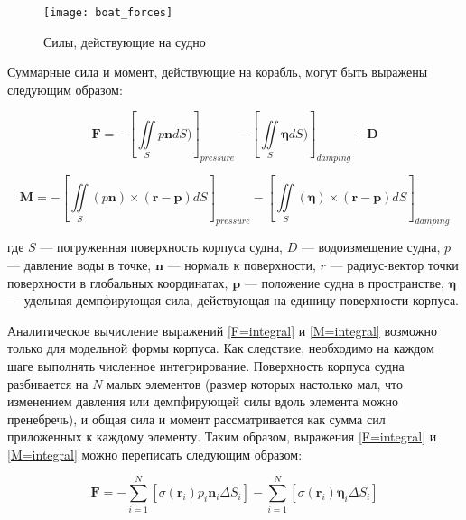 \begin{figure}[ht]
\begin{center}
\texttt{[image: boat\_forces]}
\end{center}
\caption{Силы, действующие на судно}
\label{boat_forces}
\end{figure}

Суммарные сила и момент, действующие на корабль, могут быть выражены следующим образом:

\begin{equation}
	\mathbf{F} = 
		-\left[ \iint\limits_{S} p \mathbf{n} dS ) 		\right]_{pressure}
		-\left[ \iint\limits_{S} \boldsymbol{\eta} dS ) 	\right]_{damping}
		+ \mathbf{D}
	\label{F=integral}
\end{equation}

\begin{equation}
	\mathbf{M} = 
	-\left[ \iint\limits_{S} 
		\left( p \mathbf{n} \right) \times 
		\left( \mathbf{r} - \mathbf{p} \right) dS	
	\right]_{pressure}
	-\left[ \iint\limits_{S} 
		\left( \boldsymbol{\eta} \right) \times 
		\left( \mathbf{r} - \mathbf{p} \right) dS	
	\right]_{damping}
	\label{M=integral}
\end{equation}

где $S$ --– погруженная поверхность корпуса судна, $D$ --– водоизмещение судна, $p$ –-- давление воды в точке, $\mathbf{n}$ –-- нормаль к поверхности, $r$ --– радиус-вектор точки поверхности в глобальных координатах, $\mathbf{p}$ –-- положение судна в пространстве, $\boldsymbol{\eta}$ --- удельная демпфирующая сила, действующая на единицу поверхности корпуса.

Аналитическое вычисление выражений \eqref{F=integral} и \eqref{M=integral} возможно только для модельной формы корпуса. Как следствие, необходимо на каждом шаге выполнять численное интегрирование. Поверхность корпуса судна разбивается на $N$ малых элементов (размер которых настолько мал, что изменением давления или демпфирующей силы вдоль элемента можно пренебречь), и общая сила и момент рассматривается как сумма сил приложенных к каждому элементу. Таким образом, выражения \eqref{F=integral} и \eqref{M=integral} можно переписать следующим образом:

\begin{equation}
	\mathbf{F} = 
		-\sum_{i=1}^{N} \left[
			\sigma (\mathbf{r}_i) p_i \mathbf{n}_i \Delta S_i
		\right]
		-\sum_{i=1}^{N} \left[
			\sigma (\mathbf{r}_i) \boldsymbol{\eta}_i \Delta S_i
		\right]
\end{equation}

